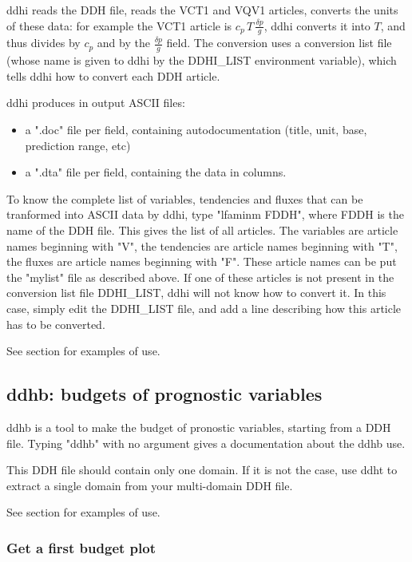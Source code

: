\p ddhi reads the DDH file, reads the VCT1 and VQV1 articles, converts the units of these data:
for example the VCT1 article is $c_p \, T \, \frac{\delta p}{g}$, ddhi converts it into $T$, and thus divides 
by $c_p$ and by the $\frac{\delta p}{g}$ field. The conversion uses a conversion list file (whose name is given to 
ddhi by the DDHI\_LIST environment variable), which
tells ddhi how to convert each DDH article. 


\p ddhi produces in output ASCII files:
\begin{itemize}
  \item a ".doc" file per field, containing autodocumentation (title, unit, base, prediction range, etc)
  \item a ".dta" file per field, containing the data in columns.
\end{itemize}

\p To know the complete list of variables, tendencies and fluxes that can be tranformed into ASCII data
by ddhi, type "lfaminm FDDH", where FDDH is the name of the DDH file.
This gives the list of all articles. The variables are article names beginning with "V",
the tendencies are article names beginning with "T", the fluxes are article names beginning with "F".
These article names can be put the "mylist" file as described above.
If one of these articles is not present in the conversion list file DDHI\_LIST, ddhi will not know
how to convert it. In this case, simply edit the DDHI\_LIST file, and add a line describing how
this article has to be converted.

\p See section  for examples of use.

\subsection{ddhb: budgets of prognostic variables}

\p ddhb is a tool to make the budget of pronostic variables, starting from a DDH file.
Typing "ddhb" with no argument gives a documentation about the ddhb use.

\p This DDH file should contain only one domain. If it is not the case, use ddht to extract a single
domain from your multi-domain DDH file.

\p See section  for examples of use.

\subsubsection{Get a first budget plot}

